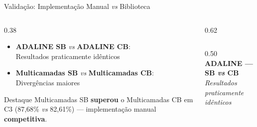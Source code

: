 \documentclass[aspectratio=169,11pt,brazil]{beamer}
\begin{document}
\begin{frame}{Validação: Implementação Manual \textit{vs} Biblioteca}
  \begin{columns}[T]
    \begin{column}{0.38\textwidth}
      \begin{itemize}\setlength{\itemsep}{6pt}
        \item \textbf{ADALINE SB} \textit{vs} \textbf{ADALINE CB}:\\
              Resultados praticamente idênticos
        \item \textbf{Multicamadas SB} \textit{vs} \textbf{Multicamadas CB}:\\
              Divergências maiores
      \end{itemize}
      \vspace{0.5em}
      \begin{block}{Destaque}
        \small Multicamadas SB \textbf{superou} o Multicamadas CB em C3 (87,68\% \textit{vs} 82,61\%) — implementação manual \textbf{competitiva}.
      \end{block}
    \end{column}
    \begin{column}{0.62\textwidth}
      \begin{columns}[c]
        \begin{column}{0.50\textwidth}
          \centering
          {\tiny\textbf{ADALINE — SB \textit{vs} CB}}\\[-0.1em]
          {\tiny\textit{\color{gray}Resultados praticamente idênticos}}
          \vspace{0.15em}


\end{column}
\end{columns}
\end{column}
\end{columns}
\end{frame}
\end{document}
